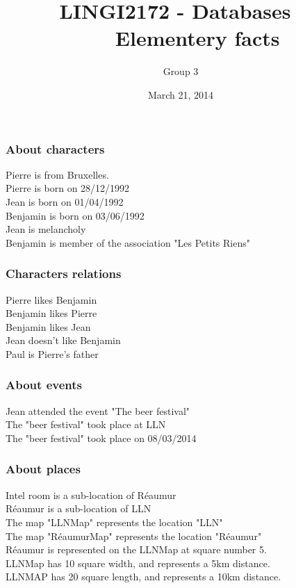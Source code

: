 \documentclass{beamer}
\title{LINGI2172 - Databases\ \\ \ \ \  Elementery facts}
\author{Group 3}
\date{March 21, 2014}
\begin{document}
\begin{frame}
\titlepage
\end{frame}

\begin{frame}[label=pagebanale]
\frametitle{About characters}
\noindent Pierre is from Bruxelles.\\
Pierre is born on 28/12/1992\\
Jean is born on 01/04/1992\\
Benjamin is born on 03/06/1992\\
Jean is melancholy\\
Benjamin is member of the association "Les Petits Riens"
\end{frame}


\begin{frame}[label=pagebanale]
\frametitle{Characters relations}
\noindent Pierre likes Benjamin\\
Benjamin likes Pierre\\
Benjamin likes Jean\\
Jean doesn't like Benjamin\\
Paul is Pierre's father\\
\end{frame}



\begin{frame}[label=pagebanale]
\frametitle{About events}

\noindent Jean attended the event "The beer festival"\\
The "beer festival" took place at LLN\\
The "beer festival" took place on 08/03/2014\\
\end{frame}


\begin{frame}[label=pagebanale]
\frametitle{About places}
\noindent Intel room is a sub-location of Réaumur\\
Réaumur is a sub-location of LLN\\
The map "LLNMap" represents the location "LLN"\\
The map "RéaumurMap" represents the location "Réaumur"\\
Réaumur is represented on the LLNMap at square number 5.\\
LLNMap has 10 square width, and represents a 5km distance.\\
LLNMAP has 20 square length, and represents a 10km distance.
\end{frame}
\end{document}
